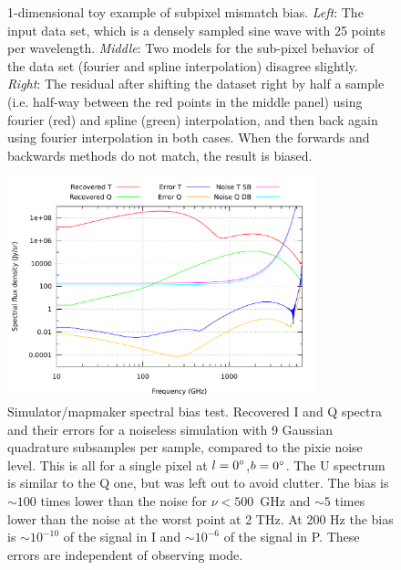 \documentclass{article}
\begin{document}
\begin{figure}
\begin{tabular}{m{59mm}m{59mm}m{59mm}}
	\end{tabular}
	\caption{1-dimensional toy example of subpixel mismatch bias.
	\emph{Left}: The input data set, which is a densely sampled sine wave with
	25 points per wavelength. \emph{Middle}: Two models for the sub-pixel behavior
	of the data set (fourier and spline interpolation) disagree slightly.
	\emph{Right}: The residual after shifting the dataset right by half a sample
	(i.e. half-way between the red points in the middle panel) using fourier
	(red) and spline (green) interpolation, and then back again using fourier interpolation
	in both cases. When the forwards and backwards methods do not match, the result is biased.}
\end{figure}

\begin{figure}
	\centering
	\includegraphics[width=0.8\textwidth]{plots/error_std_sb_abs_log_log.pdf}
	\caption{Simulator/mapmaker spectral bias test. Recovered I and Q spectra and
	their errors for a noiseless simulation
	with 9 Gaussian quadrature subsamples per sample, compared to the pixie
	noise level. This is all for a single pixel at $l=0\degree$,$b=0\degree$.
	The U spectrum is similar to the Q one, but was left out to avoid clutter.
	The bias is $\sim 100$ times lower than the noise for $\nu<500$~GHz and
	$\sim 5$ times lower than the noise at the worst point at 2 THz. At 200
	Hz the bias is $\sim 10^{-10}$ of the signal in I and $\sim 10^{-6}$
	of the signal in P. These errors are independent of observing mode.}
\end{figure}
\end{document}
